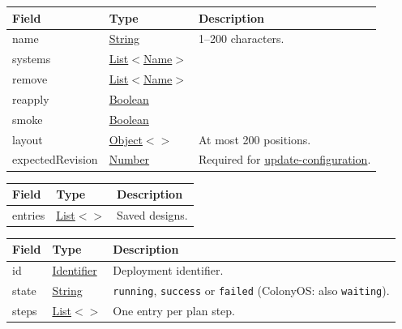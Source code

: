 \documentclass[a4paper]{arrowhead}
\newcommand{\mref}[2][]{{\textcolor{ArrowheadPurple}{\hyperref[sec:model:#2]{\ifstrempty{#1}{#2}{#1}}}}}
\newcommand{\oref}[1]{{\textcolor{ArrowheadBlue}{\hyperref[sec:operations:#1]{#1}}}}
\newcommand{\pref}[1]{{\textcolor{ArrowheadGrey}{\hyperref[sec:model:primitives:#1]{#1}}}}
\begin{document}

\noindent\begin{tabularx}{\textwidth}{| >{\raggedright\arraybackslash}p{3.6cm} | >{\raggedright\arraybackslash\small}p{4.4cm} | X |} \hline
\rowcolor{gray!33} Field & Type & Description \\ \hline
name & \pref{String} & 1--200 characters. \\ \hline
systems & \pref{List}$<$\pref{Name}$>$ &  \\ \hline
remove & \pref{List}$<$\pref{Name}$>$ &  \\ \hline
reapply & \pref{Boolean} &  \\ \hline
smoke & \pref{Boolean} &  \\ \hline
layout & \pref{Object}$<$\mref{Point}$>$ & At most 200 positions. \\ \hline
expectedRevision & \pref{Number} & Required for \oref{update-configuration}. \\ \hline
\end{tabularx}


\noindent\begin{tabularx}{\textwidth}{| >{\raggedright\arraybackslash}p{3.6cm} | >{\raggedright\arraybackslash\small}p{4.4cm} | X |} \hline
\rowcolor{gray!33} Field & Type & Description \\ \hline
entries & \pref{List}$<$\mref{Configuration}$>$ & Saved designs. \\ \hline
\end{tabularx}


\noindent\begin{tabularx}{\textwidth}{| >{\raggedright\arraybackslash}p{3.6cm} | >{\raggedright\arraybackslash\small}p{4.4cm} | X |} \hline
\rowcolor{gray!33} Field & Type & Description \\ \hline
id & \pref{Identifier} & Deployment identifier. \\ \hline
state & \pref{String} & \texttt{running}, \texttt{success} or \texttt{failed} (ColonyOS: also \texttt{waiting}). \\ \hline
steps & \pref{List}$<$\mref{StepState}$>$ & One entry per plan step. \\ \hline
\end{tabularx}

\end{document}
